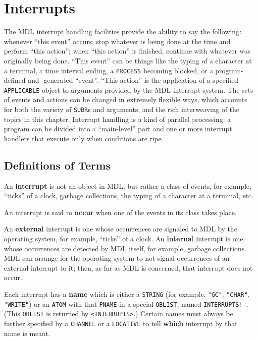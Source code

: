 \documentclass[a4paper]{scrbook}
\begin{document}
\chapter{Interrupts}\label{chapter-21.-interrupts}

The MDL interrupt handling facilities provide the ability to say the following: whenever ``this event'' occurs, stop
whatever is being done at the time and perform ``this action''; when ``this action'' is finished, continue with whatever
was originally being done. ``This event'' can be things like the typing of a character at a terminal, a time interval
ending, a \texttt{PROCESS} becoming blocked, or a program-defined and -generated ``event''. ``This action'' is the
application of a specified \texttt{APPLICABLE} object to arguments provided by the MDL interrupt system. The sets of events
and actions can be changed in extremely flexible ways, which accounts for both the variety of \texttt{SUBR}s and arguments,
and the rich interweaving of the topics in this chapter. Interrupt handling is a kind of parallel processing: a program can
be divided into a ``main-level'' part and one or more interrupt handlers that execute only when conditions are ripe.

\section{Definitions of Terms}\label{definitions-of-terms}

An \textbf{interrupt} is not an object in MDL, but rather a class of events, for example, ``ticks'' of a clock, garbage
collections, the typing of a character at a terminal, etc.

An interrupt is said to \textbf{occur} when one of the events in its class takes place.

An \textbf{external} interrupt is one whose occurrences are signaled to MDL by the operating system, for example, ``ticks''
of a clock. An \textbf{internal} interrupt is one whose occurrences are detected by MDL itself, for example, garbage
collections. MDL can arrange for the operating system to not signal occurrences of an external interrupt to it; then, as
far as MDL is concerned, that interrupt does not occur.

Each interrupt has a \textbf{name} which is either a \texttt{STRING} (for example, \texttt{"GC"}, \texttt{"CHAR"},
\texttt{"WRITE"}) or an \texttt{ATOM} with that \texttt{PNAME} in a special \texttt{OBLIST}, named
\texttt{INTERRUPTS!-}. (This \texttt{OBLIST} is returned by
\texttt{\textless{}INTERRUPTS\textgreater{}}.) Certain names must always be further specified by a \texttt{CHANNEL} or a
\texttt{LOCATIVE} to tell \textbf{which} interrupt by that name is meant.
\end{document}
